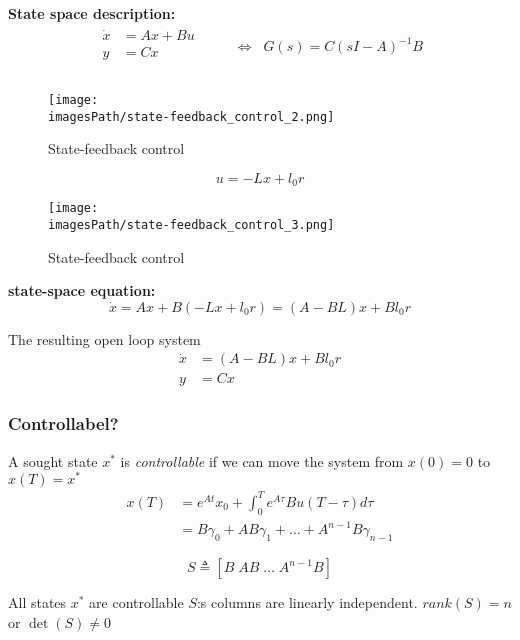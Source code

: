 \documentclass{article}
\newcommand{\imagesPath}{images}
\begin{document}
\textbf{State space description:}
\begin{align*}
    \begin{aligned}
        \dot{x} &= Ax + Bu \\
        y &= Cx \\
    \end{aligned}&
    && \Leftrightarrow \;\; G(s) = C(sI-A)^{-1}B \\
\end{align*}
\begin{figure}[!h]
    \centering
    \texttt{[image: \\imagesPath/state-feedback\_control\_2.png]}
    \caption{State-feedback control}
\end{figure}

\begin{equation*}
    u = -Lx + l_0 r
\end{equation*}
\begin{figure}[!h]
    \centering
    \texttt{[image: \\imagesPath/state-feedback\_control\_3.png]}
    \caption{State-feedback control}
\end{figure}

\textbf{state-space equation:}
\begin{equation*}
    \dot{x} = Ax + B(-Lx+l_0r) = (A-BL)x + Bl_0r
\end{equation*}

The resulting open loop system
\begin{align*}
    \dot{x} &= (A-BL)x + Bl_0r \\
    y &= Cx
\end{align*}

\subsubsection{Controllabel?}
A sought state $x^*$ is \textit{controllable} if we can move the system from $x(0)=0$
to $x(T) = x^*$
\begin{align*}
    x(T) &= e^{At}x_0 + \int_0^T e^{A\tau}Bu(T-\tau)d\tau \\ 
    &= B\gamma_0 + AB\gamma_1 + \ldots + A^{n-1}B\gamma_{n-1}
\end{align*}

\begin{equation*}
    S \triangleq [B \; AB \; \ldots \; A^{n-1}B]
\end{equation*}

All states $x^*$ are controllable $S$:s columns are linearly independent.
$rank(S) = n$ or $\det(S) \neq 0$
\end{document}
